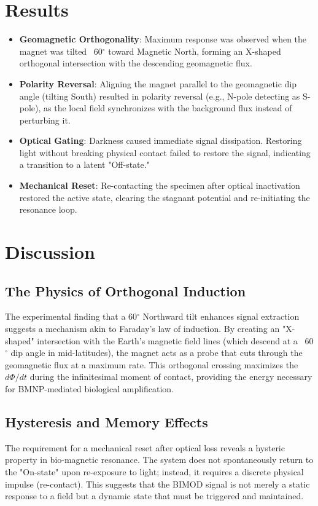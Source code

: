 \documentclass[12pt]{article}
\begin{document}
\section{Results}
\begin{itemize}
    \item \textbf{Geomagnetic Orthogonality}: Maximum response was observed when the magnet was tilted ~60$^\circ$ toward Magnetic North, forming an X-shaped orthogonal intersection with the descending geomagnetic flux. 
    \item \textbf{Polarity Reversal}: Aligning the magnet parallel to the geomagnetic dip angle (tilting South) resulted in polarity reversal (e.g., N-pole detecting as S-pole), as the local field synchronizes with the background flux instead of perturbing it.
    \item \textbf{Optical Gating}: Darkness caused immediate signal dissipation. Restoring light without breaking physical contact failed to restore the signal, indicating a transition to a latent "Off-state."
    \item \textbf{Mechanical Reset}: Re-contacting the specimen after optical inactivation restored the active state, clearing the stagnant potential and re-initiating the resonance loop.
\end{itemize}

\section{Discussion}
\subsection{The Physics of Orthogonal Induction}
The experimental finding that a 60$^\circ$ Northward tilt enhances signal extraction suggests a mechanism akin to Faraday's law of induction. By creating an "X-shaped" intersection with the Earth's magnetic field lines (which descend at a ~60$^\circ$ dip angle in mid-latitudes), the magnet acts as a probe that cuts through the geomagnetic flux at a maximum rate. This orthogonal crossing maximizes the $d\Phi/dt$ during the infinitesimal moment of contact, providing the energy necessary for BMNP-mediated biological amplification.

\subsection{Hysteresis and Memory Effects}
The requirement for a mechanical reset after optical loss reveals a hysteric property in bio-magnetic resonance. The system does not spontaneously return to the "On-state" upon re-exposure to light; instead, it requires a discrete physical impulse (re-contact). This suggests that the BIMOD signal is not merely a static response to a field but a dynamic state that must be triggered and maintained.
\end{document}
